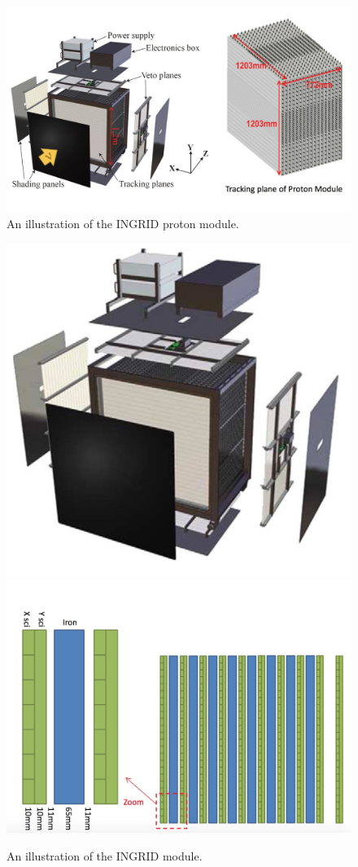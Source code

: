 \begin{figure}
\centering
\includegraphics[width=\textwidth]{figures/NeutrinoChap/NuFactTalk/ProtonModule.jpeg}
    \caption{An illustration of the INGRID proton module.}
    \label{fig:IngridProton}
\end{figure}

\begin{figure}
\centering
\includegraphics[width=.49\textwidth]{figures/NeutrinoChap/NuFactTalk/INGRID.jpeg}
\includegraphics[width=.49\textwidth]{figures/NeutrinoChap/NuFactTalk/INGRID2.jpeg}
    \caption{An illustration of the INGRID module.}
    \label{fig:IngridMod}
\end{figure}

